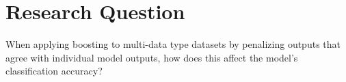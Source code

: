 \section{Research Question}







When applying boosting to multi-data type datasets by penalizing outputs that agree with individual model outputs, how does this affect the model's classification accuracy?






